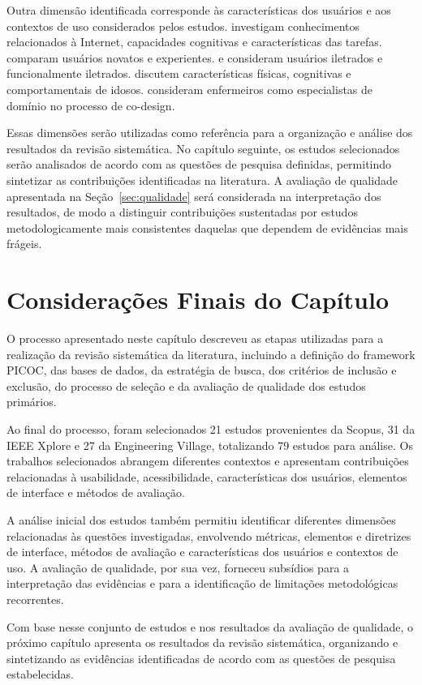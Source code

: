 Outra dimensão identificada corresponde às características dos usuários e aos contextos de uso considerados pelos estudos. \cite{sharit2008information} investigam conhecimentos relacionados à Internet, capacidades cognitivas e características das tarefas. \cite{nosseir2011novice} comparam usuários novatos e experientes. \cite{filgueiras2009recoverability} e \cite{barron2013feasibility} consideram usuários iletrados e funcionalmente iletrados. \cite{ahmad2013teaching} discutem características físicas, cognitivas e comportamentais de idosos. \cite{kymäläinen2012creating} consideram enfermeiros como especialistas de domínio no processo de co-design.

Essas dimensões serão utilizadas como referência para a organização e análise dos resultados da revisão sistemática. No capítulo seguinte, os estudos selecionados serão analisados de acordo com as questões de pesquisa definidas, permitindo sintetizar as contribuições identificadas na literatura. A avaliação de qualidade apresentada na Seção~\ref{sec:qualidade} será considerada na interpretação dos resultados, de modo a distinguir contribuições sustentadas por estudos metodologicamente mais consistentes daquelas que dependem de evidências mais frágeis.


\section{Considerações Finais do Capítulo}

O processo apresentado neste capítulo descreveu as etapas utilizadas para a realização da revisão sistemática da literatura, incluindo a definição do framework PICOC, das bases de dados, da estratégia de busca, dos critérios de inclusão e exclusão, do processo de seleção e da avaliação de qualidade dos estudos primários.

Ao final do processo, foram selecionados 21 estudos provenientes da Scopus, 31 da IEEE Xplore e 27 da Engineering Village, totalizando 79 estudos para análise. Os trabalhos selecionados abrangem diferentes contextos e apresentam contribuições relacionadas à usabilidade, acessibilidade, características dos usuários, elementos de interface e métodos de avaliação.

A análise inicial dos estudos também permitiu identificar diferentes dimensões relacionadas às questões investigadas, envolvendo métricas, elementos e diretrizes de interface, métodos de avaliação e características dos usuários e contextos de uso. A avaliação de qualidade, por sua vez, forneceu subsídios para a interpretação das evidências e para a identificação de limitações metodológicas recorrentes.

Com base nesse conjunto de estudos e nos resultados da avaliação de qualidade, o próximo capítulo apresenta os resultados da revisão sistemática, organizando e sintetizando as evidências identificadas de acordo com as questões de pesquisa estabelecidas.